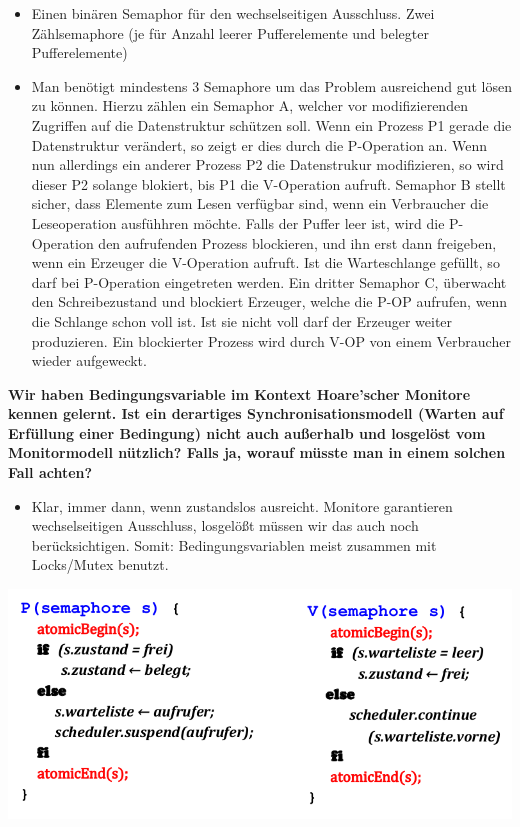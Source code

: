 \documentclass[a4paper]{article}
\begin{document}
\begin{description*}
\begin{itemize}
        \item Einen binären Semaphor für den wechselseitigen Ausschluss. Zwei Zählsemaphore (je für Anzahl leerer Pufferelemente und belegter Pufferelemente)
        \item Man benötigt mindestens 3 Semaphore um das Problem ausreichend gut lösen zu können. Hierzu zählen ein Semaphor A, welcher vor modifizierenden Zugriffen auf die Datenstruktur schützen soll. Wenn ein Prozess P1 gerade die Datenstruktur verändert, so zeigt er dies durch die P-Operation an. Wenn nun allerdings ein anderer Prozess P2 die Datenstrukur modifizieren, so wird dieser P2 solange blokiert, bis P1 die V-Operation aufruft. Semaphor B stellt sicher, dass Elemente zum Lesen verfügbar sind, wenn ein Verbraucher die Leseoperation ausfühhren möchte. Falls der Puffer leer ist, wird die P-Operation den aufrufenden Prozess blockieren, und ihn erst dann freigeben, wenn ein Erzeuger die V-Operation aufruft. Ist die Warteschlange gefüllt, so darf bei P-Operation eingetreten werden. Ein dritter Semaphor C, überwacht den Schreibezustand und blockiert Erzeuger, welche die P-OP aufrufen, wenn die Schlange schon voll ist. Ist sie nicht voll darf der Erzeuger weiter produzieren. Ein blockierter Prozess wird durch V-OP von einem Verbraucher wieder aufgeweckt.
    \end{itemize}
    \item \textbf{Wir haben Bedingungsvariable im Kontext Hoare’scher Monitore kennen gelernt. Ist ein derartiges Synchronisationsmodell (Warten auf Erfüllung einer Bedingung) nicht auch außerhalb und losgelöst vom Monitormodell nützlich? Falls ja, worauf müsste man in einem solchen Fall achten?}
    \begin{itemize}
        \item Klar, immer dann, wenn zustandslos ausreicht. Monitore garantieren wechselseitigen Ausschluss, losgelößt müssen wir das auch noch berücksichtigen. Somit: Bedingungsvariablen meist zusammen mit Locks/Mutex benutzt.
    \end{itemize}
\end{description*}
\begin{center}
    \includegraphics[width=0.8\linewidth]{Assets/Betriebssystem_uebung/u4_a1.png}
\end{center}
\end{document}
